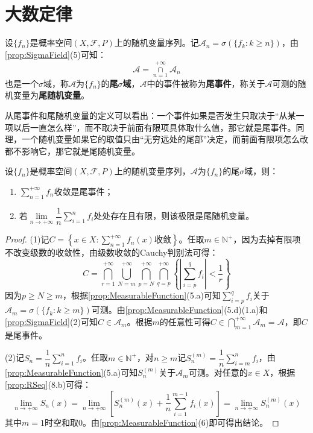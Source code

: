 \section{大数定律}

\begin{definition}
	设$\{f_n\}$是概率空间$(X,\mathscr{F},P)$上的随机变量序列。记$\mathscr{A}_n=\sigma(\{f_k:k\geqslant n\})$，由\cref{prop:SigmaField}(5)可知：
	\begin{equation*}
		\mathscr{A}=\underset{n=1}{\overset{+\infty}{\cap}}\mathscr{A}_n
	\end{equation*}
	也是一个$\sigma$域，称$\mathscr{A}$为$\{f_n\}$的\textbf{尾$\sigma$域}，$\mathscr{A}$中的事件被称为\textbf{尾事件}，称关于$\mathscr{A}$可测的随机变量为\textbf{尾随机变量}。
\end{definition}
\begin{note}
	从尾事件和尾随机变量的定义可以看出：一个事件如果是否发生只取决于“从某一项以后一直怎么样”，而不取决于前面有限项具体取什么值，那它就是尾事件。同理，一个随机变量如果它的取值只由“无穷远处的尾部”决定，而前面有限项怎么改都不影响它，那它就是尾随机变量。
\end{note}
\begin{property}\label{prop:TailConvergence}
	设$\{f_n\}$是概率空间$(X,\mathscr{F},P)$上的随机变量序列，$\mathscr{A}$为$\{f_n\}$的尾$\sigma$域，则：
	\begin{enumerate}
		\item $\sum\limits_{n=1}^{+\infty}f_n$收敛是尾事件；
		\item 若$\lim\limits_{n\to+\infty}\dfrac{1}{n}\sum\limits_{i=1}^{n}f_i$处处存在且有限，则该极限是尾随机变量。
	\end{enumerate}
\end{property}
\begin{proof}
	(1)记$C=\left\{x\in X:\sum\limits_{n=1}^{+\infty}f_n(x)\text{收敛}\right\}$。任取$m\in\mathbb{N}^+$，因为去掉有限项不改变级数的收敛性，由级数收敛的Cauchy判别法可得：
	\begin{equation*}
		C=\bigcap_{r=1}^{+\infty}\bigcup_{N=m}^{+\infty}\bigcap_{p=N}^{+\infty}\bigcap_{q=p}^{+\infty}\left\{\left|\sum_{i=p}^{q}f_i\right|<\frac{1}{r}\right\}
	\end{equation*}
	因为$p\geqslant N\geqslant m$，根据\cref{prop:MeasurableFunction}(5.a)可知$\sum\limits_{i=p}^{q}f_i$关于$\mathscr{A}_m=\sigma(\{f_k:k\geqslant m\})$可测。由\cref{prop:MeasurableFunction}(5.d)(1.a)和\cref{prop:SigmaField}(2)可知$C\in\mathscr{A}_m$。根据$m$的任意性可得$C\in\bigcap\limits_{m=1}^{+\infty}\mathscr{A}_m=\mathscr{A}$，即$C$是尾事件。\par
	(2)记$S_n=\dfrac{1}{n}\sum\limits_{i=1}^{n}f_i$。任取$m\in\mathbb{N}^+$，对$n\geqslant m$记$S_n^{(m)}=\dfrac{1}{n}\sum\limits_{i=m}^{n}f_i$，由\cref{prop:MeasurableFunction}(5.a)可知$S_n^{(m)}$关于$\mathscr{A}_m$可测。对任意的$x\in X$，根据\cref{prop:RSeq}(8.b)可得：
	\begin{equation*}
		\lim_{n\to+\infty}S_n(x)=\lim_{n\to+\infty}\left[S_n^{(m)}(x)+\frac{1}{n}\sum_{i=1}^{m-1}f_i(x)\right]=\lim_{n\to+\infty}S_n^{(m)}(x)
	\end{equation*}
	其中$m=1$时空和取$0$。由\cref{prop:MeasurableFunction}(6)即可得出结论。
\end{proof}
